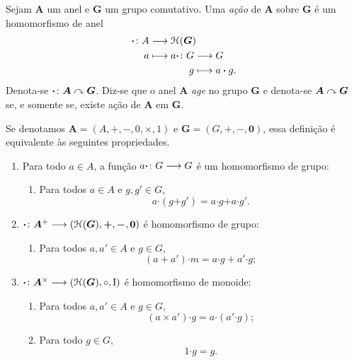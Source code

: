 \begin{definition}
Sejam $\bm A$ um anel e $\bm G$ um grupo comutativo. Uma \emph{ação} de $\bm A$ sobre $\bm G$ é um homomorfismo de anel
	\begin{align*}
	\func{\bm \cdot}{A}{\Homo(\bm G)}{a}{
		\begin{aligned}[t]
		\func{a \bm \cdot}{G}{G}{g}{a \bm \cdot g}.
		\end{aligned}
	}
	\end{align*}
Denota-se ${\bm \cdot}\colon {\bm A} \curvearrowright {\bm G}$. Diz-se que o anel $\bm A$ \emph{age} no grupo $\bm G$ e denota-se $\bm A \curvearrowright \bm G$ se, e somente se, existe ação de $\bm A$ em $\bm G$.
\end{definition}

Se denotamos $\bm A=(A,+,-,0,\times,1)$ e $\bm G = (G,\bm +,\bm -, \bm 0)$, essa definição é equivalente às seguintes propriedades.
	\begin{enumerate}
	\item  Para todo $a \in A$, a função ${a \bm \cdot}\colon {G} \longrightarrow {G}$ é um homomorfismo de grupo:
		\begin{enumerate}
		\item Para todos $a \in A$ e $g,g' \in G$,
			\begin{equation*}
			a \bm \cdot (g \bm + g') = a \bm \cdot g \bm + a \bm \cdot g'.
			\end{equation*}
		\end{enumerate}
	\item ${\bm \cdot}\colon {\bm A^+} \longrightarrow {(\mathcal{H}(\bm G),\bm +,\bm -,\bm 0)}$ é homomorfismo de grupo:
		\begin{enumerate}
		\item Para todos $a,a' \in A$ e $g \in G$,
			\begin{equation*}
			(a + a') \bm \cdot m = a \bm \cdot g + a' \bm \cdot g;
			\end{equation*}
		\end{enumerate}
	\item  ${\bm \cdot}\colon {\bm A^\times} \longrightarrow {(\mathcal{H}(\bm G),\circ,\mathrm{I})}$ é homomorfismo de monoide:
		\begin{enumerate}
		\item Para todos $a,a' \in A$ e $g \in G$,
			\begin{equation*}
			(a \times a') \bm \cdot g = a \bm \cdot (a' \bm \cdot g);
			\end{equation*}
		\item Para todo $g \in G$,
			\begin{equation*}
			1 \bm \cdot g = g.
			\end{equation*}
		\end{enumerate}
	\end{enumerate}